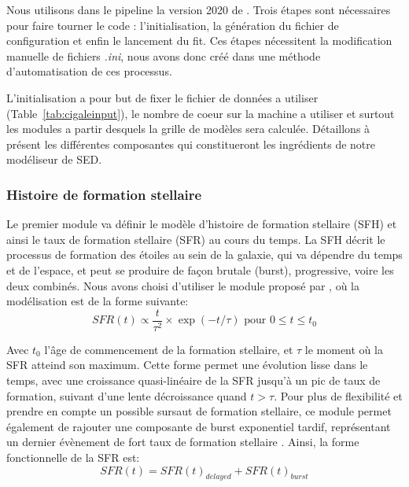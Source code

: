 \documentclass[../main/main.tex]{subfiles}
\begin{document}
Nous utilisons dans le pipeline \hypergal la version 2020 de \cigale. Trois étapes sont nécessaires pour faire tourner le code : l'initialisation, la génération du fichier de configuration et enfin le lancement du fit. Ces étapes nécessitent la modification manuelle de fichiers \textit{.ini}, nous avons donc créé dans \hypergal une méthode d'automatisation de ces processus.

L'initialisation a pour but de fixer le fichier de données a utiliser (Table~\ref{tab:cigaleinput}), le nombre de coeur sur la machine a utiliser et surtout les modules a partir desquels la grille de modèles sera calculée. Détaillons à présent les différentes composantes qui constitueront les ingrédients de notre modéliseur de SED.

\subsubsection{Histoire de formation stellaire}

Le premier module va définir le modèle d'histoire de formation stellaire (SFH) et ainsi le taux de formation stellaire (SFR) au cours du temps. La SFH décrit le processus de formation des étoiles au sein de la galaxie, qui va dépendre du temps et de l'espace,  et peut se produire de façon brutale (burst), progressive, voire les deux combinés. Nous avons choisi d'utiliser le module \textbf{} proposé par \cigale, où la modélisation est de la forme suivante:
\begin{equation}
  \label{eq:sfhdelayed}
  SFR(t)\propto \frac{t}{\tau^2}\times\exp(-t/\tau) \text{ pour $0\le t\le t_0$}
\end{equation}

Avec $t_0$ l'âge de commencement de la formation stellaire, et $\tau$ le moment où la SFR atteind son maximum. Cette forme permet une évolution lisse dans le temps, avec une croissance quasi-linéaire de la SFR jusqu'à un pic de taux de formation, suivant d'une lente décroissance quand $t>\tau$.
Pour plus de flexibilité et prendre en compte un possible sursaut de formation stellaire, ce module permet également de rajouter une composante de burst exponentiel tardif, représentant un dernier évènement de fort taux de formation stellaire \citep{Malek2018}.
Ainsi, la forme fonctionnelle de la SFR est:
\begin{equation}
  \label{eq:sfhdelayedburst}
  SFR(t) = SFR(t)_{delayed} + SFR(t)_{burst}
\end{equation}
\end{document}
